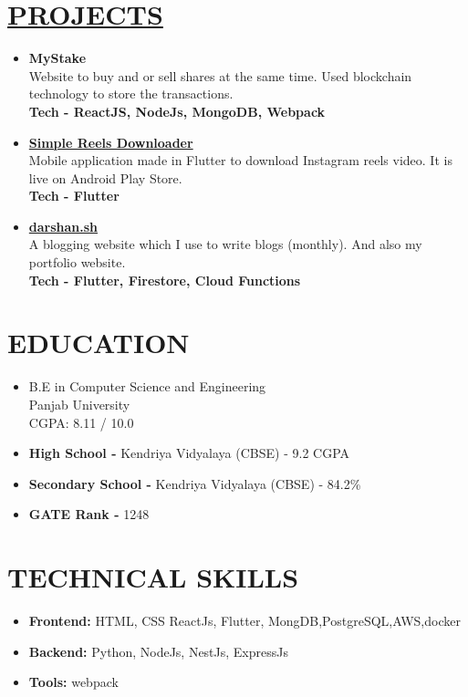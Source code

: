 \documentclass[line, margin, 12pt]{res}
\begin{document}
\begin{resume}
\section{\hyperref[https://www.github.com/darshansharma]{PROJECTS}}
\begin{itemize}
\item \textbf{{MyStake}}\\
Website to buy and or sell shares at the same time.  Used blockchain technology to store the transactions.\\
 \textbf{Tech - ReactJS, NodeJs,  MongoDB, Webpack}
\item \textbf{\href{https://play.google.com/store/apps/details?id=com.darshansharma.simple_reels_downloader}{Simple Reels Downloader}}\\
Mobile application made in Flutter to download Instagram reels video. It is live on Android Play Store.\\
 \textbf{Tech - Flutter}
\item \textbf{\href{https://darshan.sh}{darshan.sh }}\\
A blogging website which I use to write blogs (monthly). And also my portfolio website. \\
 \textbf{Tech - Flutter, Firestore, Cloud Functions}
\end{itemize}

\section{EDUCATION}
\begin{itemize}
\item B.E in Computer Science and Engineering \\
 Panjab University \\
CGPA: 8.11 / 10.0 \\
\item \textbf{High School -} Kendriya Vidyalaya (CBSE) - 9.2 CGPA
\item \textbf{Secondary School -} Kendriya Vidyalaya (CBSE) - 84.2\%
\item \textbf{GATE Rank -} 1248\\
\end{itemize}

\section{TECHNICAL SKILLS}
\begin{itemize}
\item \textbf{Frontend:} HTML, CSS ReactJs, Flutter, MongDB,PostgreSQL,AWS,docker
\item \textbf{Backend:}  Python, NodeJs, NestJs, ExpressJs
\item \textbf{Tools:} webpack
\end{itemize}

\end{resume}
\end{document}
